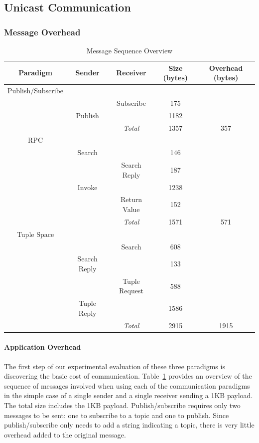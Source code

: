 \documentclass[lnicst]{svmultln}
\begin{document}
\subsection{Unicast Communication}

\subsubsection{Message Overhead}

\begin{table}
\centering
\caption{Message Sequence Overview}
\small
\begin{tabular}{|c|c|c|c|c|} \hline
Paradigm & Sender & Receiver & Size (bytes) & Overhead (bytes) \\ \hline
\rowcolor[gray]{.80}
Publish/Subscribe & & & & \\ \hline
& & Subscribe & 175 & \\
\rowcolor[gray]{.80}
& Publish & & 1182  & \\ \hline
& & \textit{Total} & 1357 & 357  \\ \hline
\rowcolor[gray]{.80}
RPC & & &  & \\ \hline
& Search & & 146 &  \\ 
\rowcolor[gray]{.80}
& & Search Reply & 187 &  \\
& Invoke & & 1238 & \\ 
\rowcolor[gray]{.80}
& & Return Value & 152 &  \\ \hline
& & \textit{Total} & 1571 & 571  \\ \hline
\rowcolor[gray]{.80}
Tuple Space & & &  & \\ \hline
& & Search & 608  & \\ 
\rowcolor[gray]{.80}
& Search Reply & & 133  & \\ 
& & Tuple Request & 588 &  \\ 
\rowcolor[gray]{.80}
& Tuple Reply & & 1586  & \\ \hline
& & \textit{Total} & 2915 & 1915  \\ \hline
\end{tabular}
\label{fig:messages}
\end{table}

\paragraph{Application Overhead}\label{sec:app_overhead}

The first step of our experimental evaluation of these three paradigms is discovering the basic cost of communication. Table~\ref{fig:messages} provides an overview of the sequence of messages involved when using each of the communication paradigms in the simple case of a single sender and a single receiver sending a 1KB payload. The total size includes the 1KB payload.
Publish/subscribe requires only two messages to be sent: one to subscribe to a topic and one to publish. Since publish/subscribe only needs to add a string indicating a topic, there is very little overhead added to the original message.
\end{document}
